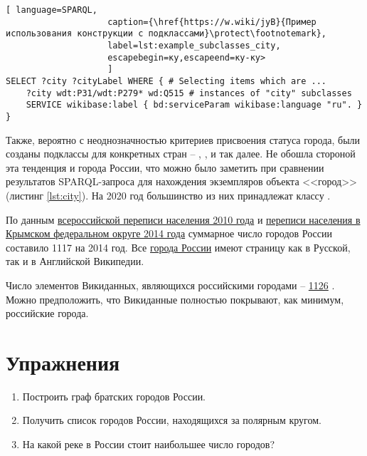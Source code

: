 \begin{lstlisting}[ language=SPARQL, 
                    caption={\href{https://w.wiki/jyB}{Пример использования конструкции с подклассами}\protect\footnotemark},
                    label=lst:example_subclasses_city, 
                    escapebegin=ку,escapeend=ку-ку>
                    ]
SELECT ?city ?cityLabel WHERE { # Selecting items which are ...
	?city wdt:P31/wdt:P279* wd:Q515 # instances of "city" subclasses
	SERVICE wikibase:label { bd:serviceParam wikibase:language "ru". }
}
\end{lstlisting}

Также, вероятно с неоднозначностью критериев присвоения статуса города, были созданы подклассы для конкретных стран -- , ,  и так далее. Не обошла стороной эта тенденция и города России, что можно было заметить при сравнении результатов SPARQL-запроса для нахождения экземпляров объекта <<город>> (листинг \ref{lst:city}). На 2020 год большинство из них принадлежат классу .

По данным \href{https://bit.ly/2JPL34b}{всероссийской переписи населения 2010 года}\cite{city_perepis_2010} и \href{https://bit.ly/2Lflc6F}{переписи населения в Крымском федеральном округе 2014 года}\cite{city_perepis_2014} суммарное число городов России составило \num{1117} на 2014 год. Все \href{https://w.wiki/oLE}{города России} имеют страницу как в Русской, так и в Английской Википедии.

Число элементов Викиданных, являющихся российскими городами -- \href{https://w.wiki/jyP}{\num{1126}} . Можно предположить, что Викиданные полностью покрывают, как минимум, российские города. 

\section{Упражнения}
\begin{enumerate}
\item Построить граф братских городов России.
\item Получить список городов России, находящихся за полярным кругом.
\item На какой реке в России стоит наибольшее число городов?
\end{enumerate}